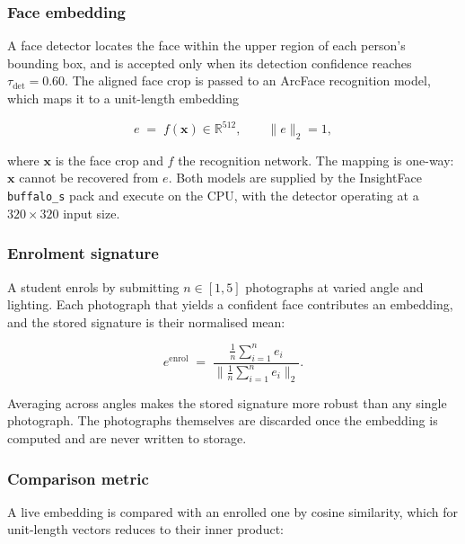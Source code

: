 \subsubsection{Face embedding}
\label{subsubsec:signature}

A face detector locates the face within the upper region of each person's
bounding box, and is accepted only when its detection confidence reaches
$\tau_{\mathrm{det}} = 0.60$. The aligned face crop is passed to an
ArcFace recognition model, which maps it to a unit-length embedding

\begin{equation}
e \;=\; f(\mathbf{x}) \in \mathbb{R}^{512},
\qquad \lVert e \rVert_2 = 1,
\label{eq:embedding}
\end{equation}

\noindent where $\mathbf{x}$ is the face crop and $f$ the recognition
network. The mapping is one-way: $\mathbf{x}$ cannot be recovered from
$e$. Both models are supplied by the InsightFace
\texttt{buffalo\_s} pack and execute on the CPU, with the detector
operating at a $320 \times 320$ input size.

\subsubsection{Enrolment signature}
\label{subsubsec:enrolment}

A student enrols by submitting $n \in [1, 5]$ photographs at varied angle
and lighting. Each photograph that yields a confident face contributes an
embedding, and the stored signature is their normalised mean:

\begin{equation}
e^{\mathrm{enrol}} \;=\;
\frac{\frac{1}{n}\sum_{i=1}^{n} e_i}
     {\bigl\lVert \frac{1}{n}\sum_{i=1}^{n} e_i \bigr\rVert_2}.
\label{eq:enrol}
\end{equation}

\noindent Averaging across angles makes the stored signature more robust
than any single photograph. The photographs themselves are discarded once
the embedding is computed and are never written to storage.

\subsubsection{Comparison metric}
\label{subsubsec:psim}

A live embedding is compared with an enrolled one by cosine similarity,
which for unit-length vectors reduces to their inner product:

